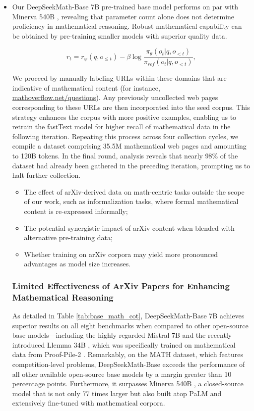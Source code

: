 \begin{itemize}[topsep=0pt]
    \item Our DeepSeekMath-Base 7B pre-trained base model performs on par with Minerva 540B \citep{minerva}, revealing that parameter count alone does not determine proficiency in mathematical reasoning. Robust mathematical capability can be obtained by pre-training smaller models with superior quality data.

\begin{equation}
    r_{t} = r_\varphi(q, o_{\le t}) - \beta \log\frac{\pi_{\theta}(o_{t}|q, o_{<t})}{\pi_{ref}(o_{t}|q, o_{<t})},
\label{eq:PPO-reward}
\end{equation}

We proceed by manually labeling URLs within these domains that are indicative of mathematical content (for instance, \url{mathoverflow.net/questions}). Any previously uncollected web pages corresponding to these URLs are then incorporated into the seed corpus. This strategy enhances the corpus with more positive examples, enabling us to retrain the fastText model for higher recall of mathematical data in the following iteration. Repeating this process across four collection cycles, we compile a dataset comprising 35.5M mathematical web pages and amounting to 120B tokens. In the final round, analysis reveals that nearly 98\% of the dataset had already been gathered in the preceding iteration, prompting us to halt further collection.

\begin{itemize}[topsep=0pt]
    \item The effect of arXiv-derived data on math-centric tasks outside the scope of our work, such as informalization tasks, where formal mathematical content is re-expressed informally;
    \item The potential synergistic impact of arXiv content when blended with alternative pre-training data;
    \item Whether training on arXiv corpora may yield more pronounced advantages as model size increases.
\end{itemize}

\subsubsection{Limited Effectiveness of ArXiv Papers for Enhancing Mathematical Reasoning}

As detailed in Table \ref{tab:base_math_cot}, DeepSeekMath-Base 7B achieves superior results on all eight benchmarks when compared to other open-source base models—including the highly regarded Mistral 7B \citep{mistral} and the recently introduced Llemma 34B \citep{llemma}, which was specifically trained on mathematical data from Proof-Pile-2 \citep{llemma}. Remarkably, on the MATH dataset, which features competition-level problems, DeepSeekMath-Base exceeds the performance of all other available open-source base models by a margin greater than 10 percentage points. Furthermore, it surpasses Minerva 540B \citep{minerva}, a closed-source model that is not only 77 times larger but also built atop PaLM \citep{palm} and extensively fine-tuned with mathematical corpora.


\end{itemize}
